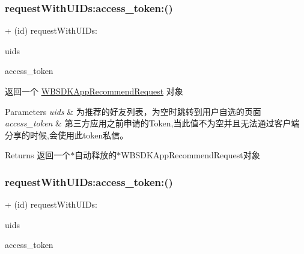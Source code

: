 \subsubsection{\texorpdfstring{request\+With\+U\+I\+Ds\+:access\+\_\+token\+:()}{requestWithUIDs:access\_token:()}\hspace{0.1cm}{\footnotesize\ttfamily [1/3]}}
{\footnotesize\ttfamily + (id) request\+With\+U\+I\+Ds\+: \begin{DoxyParamCaption}\item[{(N\+S\+Array $\ast$)}]{uids }\item[{access_token:(N\+S\+String $\ast$)}]{access\+\_\+token }\end{DoxyParamCaption}}

返回一个 \mbox{\hyperlink{interface_w_b_s_d_k_app_recommend_request}{W\+B\+S\+D\+K\+App\+Recommend\+Request}} 对象


\begin{DoxyParams}{Parameters}
{\em uids} & 为推荐的好友列表，为空时跳转到用户自选的页面 \\
\hline
{\em access\+\_\+token} & 第三方应用之前申请的\+Token,当此值不为空并且无法通过客户端分享的时候,会使用此token私信。 \\
\hline
\end{DoxyParams}
\begin{DoxyReturn}{Returns}
返回一个$\ast$自动释放的$\ast$\+W\+B\+S\+D\+K\+App\+Recommend\+Request对象 
\end{DoxyReturn}
\mbox{\label{interface_w_b_s_d_k_app_recommend_request_acc546a201fde3801e2aa5adc4957ca24}} 
\subsubsection{\texorpdfstring{request\+With\+U\+I\+Ds\+:access\+\_\+token\+:()}{requestWithUIDs:access\_token:()}\hspace{0.1cm}{\footnotesize\ttfamily [2/3]}}
{\footnotesize\ttfamily + (id) request\+With\+U\+I\+Ds\+: \begin{DoxyParamCaption}\item[{(N\+S\+Array $\ast$)}]{uids }\item[{access_token:(N\+S\+String $\ast$)}]{access\+\_\+token }\end{DoxyParamCaption}}

